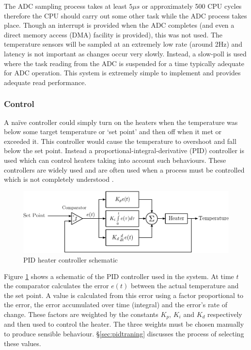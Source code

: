 				The ADC sampling process takes at least $5\mu{}s$ or approximately 500
				CPU cycles \cite{LPC1768} therefore the CPU should carry out some other
				task while the ADC process takes place. Though an interrupt is provided
				when the ADC completes (and even a direct memory access (DMA) facility
				is provided), this was not used. The temperature sensors will be sampled
				at an extremely low rate (around 2Hz) and latency is not important as
				changes occur very slowly. Instead, a slow-poll is used where the task
				reading from the ADC is suspended for a time typically adequate for ADC
				operation. This system is extremely simple to implement and provides
				adequate read performance.
			
			\subsubsection{Control}
				
				A na\"{i}ve controller could simply turn on the heaters when the
				temperature was below some target temperature or `set point' and then
				off when it met or exceeded it. This controller would cause the
				temperature to overshoot and fall below the set point. Instead a
				proportional-integral-derivative (PID) controller is used which can
				control heaters taking into account such behaviours. These controllers
				are widely used and are often used when a process must be controlled
				which is not completely understood \cite{controleng}.
				
				\begin{figure}
					\includegraphics[width=1\textwidth]{diagrams/pid.pdf}
					\caption{PID heater controller schematic}
					\label{fig:pid}
				\end{figure}
				
				Figure \ref{fig:pid} shows a schematic of the PID controller used in the
				system. At time $t$ the comparator calculates the error $e(t)$ between
				the actual temperature and the set point. A value is calculated from
				this error using a factor proportional to the error, the error
				accumulated over time (integral) and the error's rate of change. These
				factors are weighted by the constants $K_p$, $K_i$ and $K_d$
				respectively and then used to control the heater. The three weights must
				be chosen manually to produce sensible behaviour.
				\S\ref{sec:pidtraning} discusses the process of selecting these values.
				
